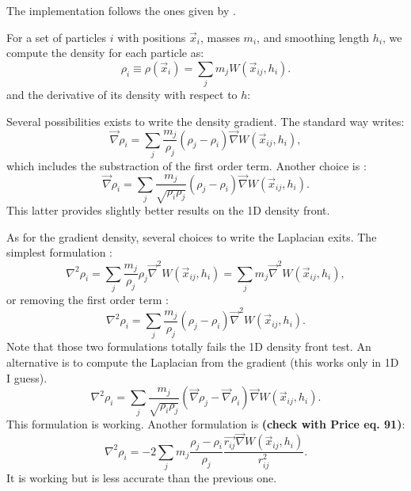 The implementation follows the ones given by \citet{nori2024}.

For a set of particles $i$ with positions $\vec{x}_i$, masses $m_i$,
and smoothing length $h_i$, we compute the density for each particle as:
%
\begin{equation}
  \rho_i \equiv \rho(\vec{x}_i) = \sum_j m_j W(\vec{x}_{ij}, h_i).
  \label{eq:uldm:rho}
\end{equation}
and the derivative of its density with respect to $h$:

\noindent
Several possibilities exists to write the density gradient.
The standard way writes:
\begin{equation}
  \label{eq:uldm:grad_rho}
  \vec{\nabla} \rho_i =  \sum_j \frac{m_j}{\rho_j} \left( \rho_j - \rho_i \right) \vec{\nabla} W(\vec{x}_{ij}, h_i),
\end{equation}
which includes the substraction of the first order term. 
Another choice is \citep{nori2024}:
%
\begin{equation}
  \label{eq:uldm:grad_rho}
  \vec{\nabla} \rho_i =  \sum_j \frac{m_j}{\sqrt{\rho_i \rho_j}} \left( \rho_j - \rho_i \right) \vec{\nabla} W(\vec{x}_{ij}, h_i).
\end{equation}
This latter provides slightly better results on the 1D density front.

\noindent
As for the gradient density, several choices to write the Laplacian exits.
The simplest formulation  \citep[][Eq.~86]{price2012}:
%
\begin{equation}
  \nabla^2 \rho_i =  \sum_j \frac{m_j}{\rho_j} \rho_j \vec{\nabla}^2 W(\vec{x}_{ij}, h_i) =  \sum_j m_j  \vec{\nabla}^2 W(\vec{x}_{ij}, h_i),
\end{equation}
or removing the first order term \citep[][Eq.~90]{price2012}:
%
\begin{equation}
  \nabla^2 \rho_i =  \sum_j \frac{m_j}{\rho_j} \left( \rho_j - \rho_i \right)  \vec{\nabla}^2 W(\vec{x}_{ij}, h_i).
\end{equation}
Note that those two formulations totally fails the 1D density front test.
An alternative is to compute the Laplacian from the gradient (this works only in 1D I guess).
%
\begin{equation}
  \nabla^2 \rho_i =  \sum_j \frac{m_j}{\sqrt{\rho_i \rho_j}} \left( \vec{\nabla}\rho_j - \vec{\nabla}\rho_i \right) \vec{\nabla} W(\vec{x}_{ij}, h_i).
\end{equation}
This formulation is working.
Another formulation is \citep[][Eq.~18]{nori2018} {\bf (check with Price eq. 91)}:
%
\begin{equation}
  \nabla^2 \rho_i =  -2 \sum_j m_j \frac{ \rho_j - \rho_i }{\rho_j} \frac{ \vec{r_{ij}} \vec{\nabla} W(\vec{x}_{ij}, h_i)}{r^2_{ij}}.
\end{equation}
It is working but is less accurate than the previous one.




